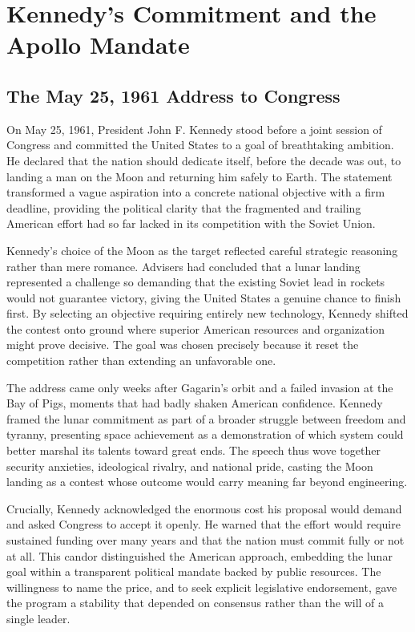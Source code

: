\section{Kennedy's Commitment and the Apollo Mandate}

\subsection{The May 25, 1961 Address to Congress}
On May 25, 1961, President John F. Kennedy stood before a joint session of Congress and committed the United States to a goal of breathtaking ambition. He declared that the nation should dedicate itself, before the decade was out, to landing a man on the Moon and returning him safely to Earth. The statement transformed a vague aspiration into a concrete national objective with a firm deadline, providing the political clarity that the fragmented and trailing American effort had so far lacked in its competition with the Soviet Union.

Kennedy's choice of the Moon as the target reflected careful strategic reasoning rather than mere romance. Advisers had concluded that a lunar landing represented a challenge so demanding that the existing Soviet lead in rockets would not guarantee victory, giving the United States a genuine chance to finish first. By selecting an objective requiring entirely new technology, Kennedy shifted the contest onto ground where superior American resources and organization might prove decisive. The goal was chosen precisely because it reset the competition rather than extending an unfavorable one.

The address came only weeks after Gagarin's orbit and a failed invasion at the Bay of Pigs, moments that had badly shaken American confidence. Kennedy framed the lunar commitment as part of a broader struggle between freedom and tyranny, presenting space achievement as a demonstration of which system could better marshal its talents toward great ends. The speech thus wove together security anxieties, ideological rivalry, and national pride, casting the Moon landing as a contest whose outcome would carry meaning far beyond engineering.

Crucially, Kennedy acknowledged the enormous cost his proposal would demand and asked Congress to accept it openly. He warned that the effort would require sustained funding over many years and that the nation must commit fully or not at all. This candor distinguished the American approach, embedding the lunar goal within a transparent political mandate backed by public resources. The willingness to name the price, and to seek explicit legislative endorsement, gave the program a stability that depended on consensus rather than the will of a single leader.

